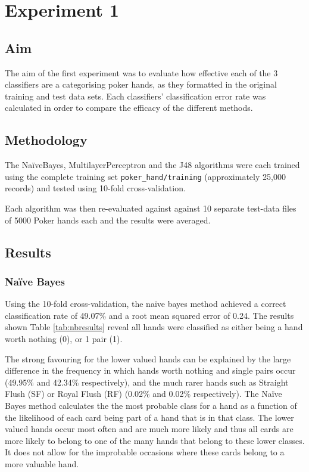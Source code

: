 \documentclass[11pt, a4paper]{article}
\begin{document}
\section*{Experiment 1}

\subsection*{Aim}

The aim of the first experiment was to evaluate how effective each of the 3 classifiers are a categorising poker hands, as they formatted in the original training and test data sets. Each classifiers' classification error rate was calculated in order to compare the efficacy of the different methods.

\subsection*{Methodology}

The Na\"iveBayes, MultilayerPerceptron and the J48 algorithms were each trained using the complete training set \texttt{poker\_hand/training} (approximately 25,000 records) and tested using 10-fold cross-validation.

Each algorithm was then re-evaluated against against 10 separate test-data files of 5000 Poker hands each and the results were averaged. 

\subsection*{Results}

\subsubsection*{Na\"ive Bayes}

Using the 10-fold cross-validation, the na\"ive bayes method achieved a correct classification rate of 49.07\% and a root mean squared error of 0.24. The results shown Table \ref{tab:nbresults} reveal all hands were classified as either being a hand worth nothing (0), or 1 pair (1). 

The strong favouring for the lower valued hands can be explained by the large difference in the frequency in which hands worth nothing and single pairs occur (49.95\% and 42.34\% respectively), and the much rarer hands such as Straight Flush (SF) or Royal Flush (RF) (0.02\% and 0.02\% respectively). The Na\"ive Bayes method calculates the the most probable class for a hand as a function of the likelihood of each card being part of a hand that is in that class. The lower valued hands occur most often and are much more likely and thus all cards are more likely to belong to one of the many hands that belong to these lower classes. It does not allow for the improbable occasions where these cards belong to a more valuable hand.
\end{document}
